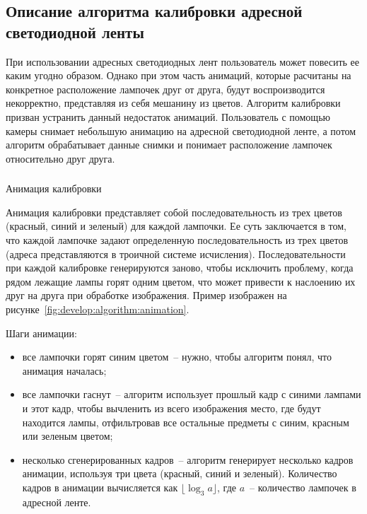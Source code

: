\subsection{Описание алгоритма калибровки адресной светодиодной ленты}
\label{sec:develop:algorithm}

При использовании адресных светодиодных лент пользователь может повесить ее каким угодно образом. Однако при этом часть анимаций, которые расчитаны на конкретное расположение лампочек друг от друга, будут воспроизводится некорректно, представляя из себя мешанину из цветов. Алгоритм калибровки призван устранить данный недостаток анимаций. Пользователь с помощью камеры снимает небольшую анимацию на адресной светодиодной ленте, а потом алгоритм обрабатывает данные снимки и понимает расположение лампочек относительно друг друга.

\subsubsection{} Анимация калибровки
\label{sec:develop:algorithm:animation}

Анимация калибровки представляет собой последовательность из трех цветов (красный, синий и зеленый) для каждой лампочки. Ее суть заключается в том, что каждой лампочке задают определенную последовательность из трех цветов (адреса представляются в троичной системе исчисления). Последовательности при каждой калибровке генерируются заново, чтобы исключить проблему, когда рядом лежащие лампы горят одним цветом, что может привести к наслоению их друг на друга при обработке изображения. Пример изображен на рисунке~\ref{fig:develop:algorithm:animation}.

Шаги анимации:
\begin{itemize}
	\item все лампочки горят синим цветом~-- нужно, чтобы алгоритм понял, что анимация началась;
	\item все лампочки гаснут~-- алгоритм использует прошлый кадр с синими лампами и этот кадр, чтобы вычленить из всего изображения место, где будут находится лампы, отфильтровав все остальные предметы с синим, красным или зеленым цветом;
	\item несколько сгенерированных кадров~-- алгоритм генерирует несколько кадров анимации, используя три цвета (красный, синий и зеленый). Количество кадров в анимации вычисляется как $\lfloor\log_3 a\rfloor$, где $a$~-- количество лампочек в адресной ленте.
\end{itemize}

